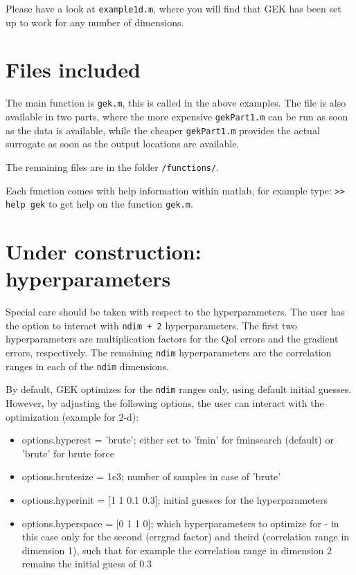 \documentclass[a4paper,10pt]{article}
\begin{document}
Please have a look at \texttt{example1d.m}, where you will find that GEK has been set up to work for any number of dimensions.

\section{Files included}
The main function is \texttt{gek.m}, this is called in the above examples. The file is also available in two parts, where the more expensive \texttt{gekPart1.m} can be run as soon as the data is available, while the cheaper \texttt{gekPart1.m} provides the actual surrogate as soon as the output locations are available.

The remaining files are in the folder \texttt{/functions/}.

Each function comes with help information within matlab, for example type: \texttt{>> help gek} to get help on the function \texttt{gek.m}.

\section{Under construction: hyperparameters}
Special care should be taken with respect to the hyperparameters. The user has the option to interact with \texttt{ndim + 2} hyperparameters. The first two hyperparameters are multiplication factors for the QoI errors and the gradient errors, respectively. The remaining \texttt{ndim} hyperparameters are the correlation ranges in each of the \texttt{ndim} dimensions.

By default, GEK optimizes for the \texttt{ndim} ranges only, using default initial guesses. However, by adjusting the following options, the user can interact with the optimization (example for 2-d):

\begin{itemize}
\item options.hyperest = 'brute'; either set to 'fmin' for fminsearch (default) or 'brute' for brute force
\item options.brutesize = 1e3; number of samples in case of 'brute'
\item options.hyperinit = [1 1 0.1 0.3]; initial guesses for the hyperparameters
\item options.hyperspace = [0 1 1 0]; which hyperparameters to optimize for - in this case only for the second (errgrad factor) and theird (correlation range in dimension 1), such that for example the correlation range in dimension 2 remains the initial guess of 0.3
\end{itemize}
\end{document}
